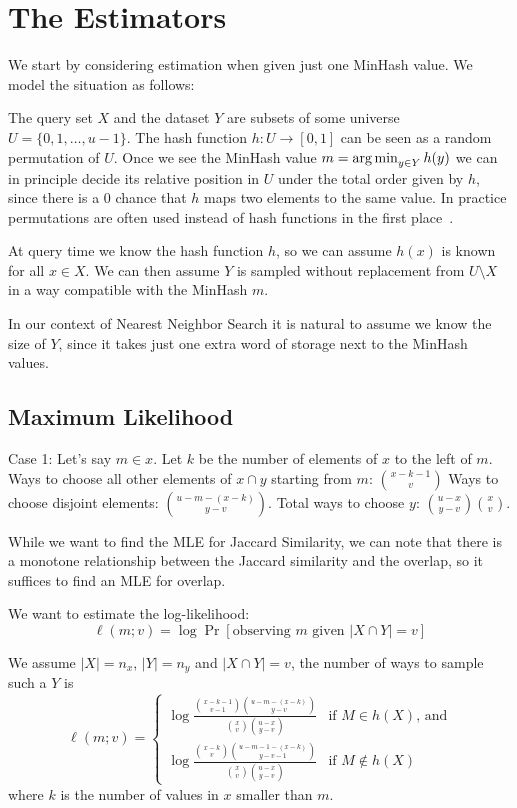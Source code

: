 
\section{The Estimators}

We start by considering estimation when given just one MinHash value.
We model the situation as follows:

The query set $X$ and the dataset $Y$ are subsets of some universe $U=\{0,1,\dots,u-1\}$.
The hash function $h:U\to[0,1]$ can be seen as a random permutation of $U$.
Once we see the MinHash value $m=\operatorname*{arg\,min}_{y\in Y}h(y)$ we can in principle decide its relative position in $U$ under the total order given by $h$, since there is a 0 chance that $h$ maps two elements to the same value.
In practice permutations are often used instead of hash functions in the first place~\cite{broder2000min}.

At query time we know the hash function $h$, so we can assume $h(x)$ is known for all $x\in X$.
We can then assume $Y$ is sampled without replacement from $U\setminus X$ in a way compatible with the MinHash $m$.

In our context of Nearest Neighbor Search it is natural to assume we know the size of $Y$, since it takes just one extra word of storage next to the MinHash values.

\subsection{Maximum Likelihood}

Case 1: Let's say $m\in x$.
Let $k$ be the number of elements of $x$ to the left of $m$.
Ways to choose all other elements of $x\cap y$ starting from $m$: $x-k-1\choose v$
Ways to choose disjoint elements: $u-m-(x-k)\choose y-v$.
Total ways to choose $y$: $\binom{u-x}{y-v}\binom{x}{v}$.


While we want to find the MLE for Jaccard Similarity, we can note that there is a monotone relationship between the Jaccard similarity and the overlap, so it suffices to find an MLE for overlap.

We want to estimate the log-likelihood:
\[
   \ell(m; v) = \log\Pr[\text{observing $m$ given $|X\cap Y|=v$}]
\]

We assume $|X|=n_x$, $|Y|=n_y$ and $|X\cap Y|=v$, the number of ways to sample such a $Y$ is
\[
   \ell(m;v) = \begin{cases}
\log\frac{\binom{x-k-1}{v-1}\binom{u-m-(x-k)}{y-v}}{\binom{x}{v}\binom{u-x}{y-v}}
&
\text{if $M\in h(X)$, and}
 \\
\log\frac{\binom{x-k}{v}\binom{u-m-1-(x-k)}{y-v-1}}{\binom{x}{v}\binom{u-x}{y-v}}
&
\text{if $M\not\in h(X)$}
 \end{cases}
 \label{eq:prob}
 \]
where $k$ is the number of values in $x$ smaller than $m$.

